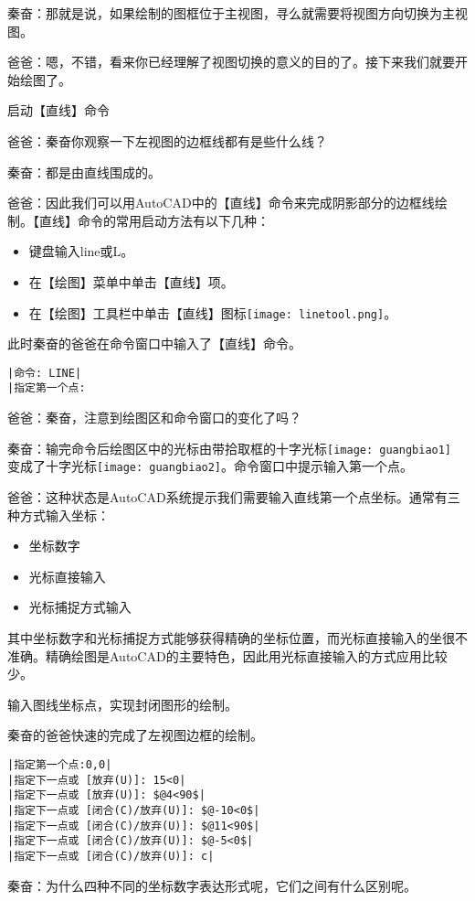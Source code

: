 \begin{procedure}
秦奋：那就是说，如果绘制的图框位于主视图，寻么就需要将视图方向切换为主视图。

爸爸：嗯，不错，看来你已经理解了视图切换的意义的目的了。接下来我们就要开始绘图了。
\item 启动【直线】命令

爸爸：秦奋你观察一下左视图的边框线都有是些什么线？

秦奋：都是由直线围成的。

爸爸：因此我们可以用AutoCAD中的【直线】命令来完成阴影部分的边框线绘制。【直线】命令的常用启动方法有以下几种：
\begin{itemize}
\item 键盘输入line或L。
\item 在【绘图】菜单中单击【直线】项。
\item 在【绘图】工具栏中单击【直线】图标\texttt{[image: linetool.png]}。
\end{itemize}
此时秦奋的爸爸在命令窗口中输入了【直线】命令。
\begin{lstlisting}
|命令: LINE|
|指定第一个点:
\end{lstlisting}
爸爸：秦奋，注意到绘图区和命令窗口的变化了吗？

秦奋：输完命令后绘图区中的光标由带拾取框的十字光标\texttt{[image: guangbiao1]} 变成了十字光标\texttt{[image: guangbiao2]}。命令窗口中提示输入第一个点。

爸爸：这种状态是AutoCAD系统提示我们需要输入直线第一个点坐标。通常有三种方式输入坐标：
\begin{itemize}
\item 坐标数字
\item 光标直接输入
\item 光标捕捉方式输入
\end{itemize}

其中坐标数字和光标捕捉方式能够获得精确的坐标位置，而光标直接输入的坐很不准确。精确绘图是AutoCAD的主要特色，因此用光标直接输入的方式应用比较少。
\item 输入图线坐标点，实现封闭图形的绘制。

秦奋的爸爸快速的完成了左视图边框的绘制。
\begin{lstlisting}
|指定第一个点:0,0|
|指定下一点或 [放弃(U)]: 15<0|
|指定下一点或 [放弃(U)]: $@4<90$|
|指定下一点或 [闭合(C)/放弃(U)]: $@-10<0$|
|指定下一点或 [闭合(C)/放弃(U)]: $@11<90$|
|指定下一点或 [闭合(C)/放弃(U)]: $@-5<0$|
|指定下一点或 [闭合(C)/放弃(U)]: c|
\end{lstlisting}
秦奋：为什么四种不同的坐标数字表达形式呢，它们之间有什么区别呢。
\end{procedure}

